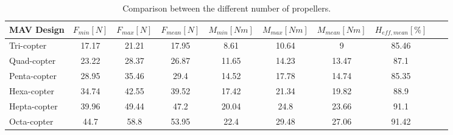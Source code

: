 \begin{table}[h]
\begin{center}
 \caption{Comparison between the different number of propellers.}\vspace{1ex}
 \label{tab:tabnefz}
 \begin{tabular}{l|ccccccccc}
 \hline
 MAV Design & $F_{min} [N]$ & $F_{max} [N]$ & $F_{mean} [N]$ & $M_{min} [Nm]$ & $M_{max} [Nm]$ & $M_{mean} [Nm]$ & $H_{eff,mean} [\%]$ \\ \hline \hline
 Tri-copter  & 17.17 & 21.21 & 17.95 & 8.61 & 10.64 & 9 & 85.46\\
 Quad-copter & 23.22 & 28.37 & 26.87 & 11.65 & 14.23 & 13.47& 87.1 \\
 Penta-copter  & 28.95 & 35.46 & 29.4 & 14.52 & 17.78 & 14.74 & 85.35\\
 Hexa-copter  & 34.74 & 42.55 & 39.52 & 17.42 & 21.34 & 19.82 & 88.9\\
 Hepta-copter  & 39.96 & 49.44 & 47.2 & 20.04 & 24.8 & 23.66 & 91.1\\
 Octa-copter  & 44.7 & 58.8 & 53.95 & 22.4 & 29.48 & 27.06 & 91.42\\
 \hline
 \end{tabular}
\end{center}
\end{table}

